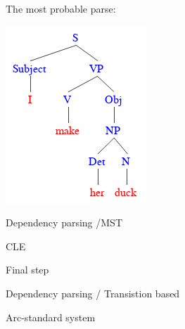 \documentclass[12pt]{article}
\newenvironment{question}[2][Question]{\begin{trivlist}
\item[\hskip \labelsep {\bfseries #1}\hskip \labelsep {\bfseries #2.}]}{\end{trivlist}}
\newenvironment{answer}[2][Answer]{\begin{trivlist}
\item[\hskip \labelsep {\bfseries #1}\hskip \labelsep {\bfseries #2:}]}{\end{trivlist}}
\begin{document}
\begin{answer}{a)}
\end{answer}
\begin{answer}{b)}

  The most probable parse:

  \includegraphics[scale=0.5]{tree}

\end{answer}

\begin{question}{3}
Dependency parsing /MST
\end{question}

\begin{answer}{a)}{CLE}


\end{answer}

\begin{answer}{b)}{Final step}


\end{answer}

\begin{question}{4}
Dependency parsing / Transistion based
\end{question}

\begin{answer}{a)}{Arc-standard system}


\end{answer}
\end{document}
